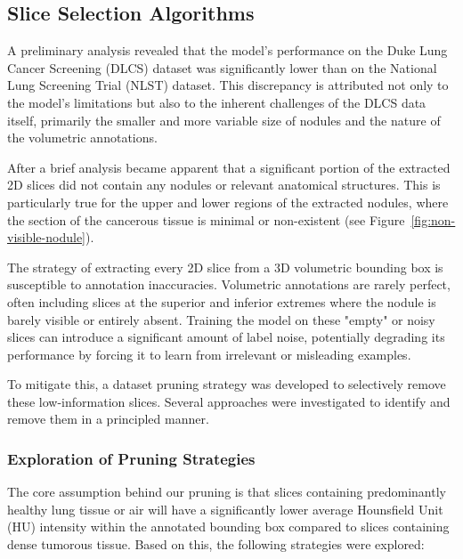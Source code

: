 \subsection{Slice Selection Algorithms}
\label{sec:dataset_pruning}
A preliminary analysis revealed that the model's performance on the Duke Lung Cancer Screening (DLCS) dataset was significantly lower than on the National Lung Screening Trial (NLST) dataset. This discrepancy is attributed not only to the model's limitations but also to the inherent challenges of the DLCS data itself, primarily the smaller and more variable size of nodules and the nature of the volumetric annotations.

After a brief analysis became apparent that a significant portion of the extracted 2D slices did not contain any nodules or relevant anatomical structures. This is particularly true for the upper and lower regions of the extracted nodules, where the section of the cancerous tissue is minimal or non-existent (see Figure~\ref{fig:non-visible-nodule}).



The strategy of extracting every 2D slice from a 3D volumetric bounding box is susceptible to annotation inaccuracies. Volumetric annotations are rarely perfect, often including slices at the superior and inferior extremes where the nodule is barely visible or entirely absent. Training the model on these "empty" or noisy slices can introduce a significant amount of label noise, potentially degrading its performance by forcing it to learn from irrelevant or misleading examples.

To mitigate this, a dataset pruning strategy was developed to selectively remove these low-information slices. Several approaches were investigated to identify and remove them in a principled manner.

\subsubsection{Exploration of Pruning Strategies}
The core assumption behind our pruning is that slices containing predominantly healthy lung tissue or air will have a significantly lower average Hounsfield Unit (HU) intensity within the annotated bounding box compared to slices containing dense tumorous tissue. Based on this, the following strategies were explored:

